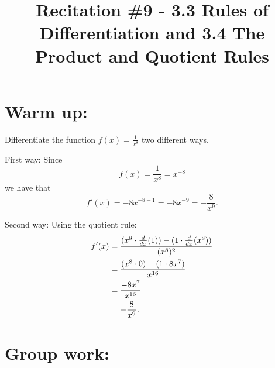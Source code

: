 \documentclass[handout,nooutcomes]{ximera}
\title{Recitation \#9 - 3.3 Rules of Differentiation and 3.4 The Product and Quotient Rules}
\begin{document}
\begin{abstract}		\end{abstract}
\maketitle

\section*{Warm up:} 
Differentiate the function $f(x) = \frac{1}{x^8}$ two different ways.

	\begin{freeResponse}
	First way:  Since 
	$$f(x) = \frac{1}{x^8} = x^{-8}$$
	we have that
	$$f'(x) = -8x^{-8-1} = -8x^{-9} = -\frac{8}{x^9}.$$
	
	Second way:  Using the quotient rule: 
	\begin{align*}
	f'(x) &= \frac{(x^8 \cdot \frac{d}{dx}(1)) - (1 \cdot \frac{d}{dx}(x^8))}{(x^8)^2}  \\
	&= \frac{(x^8 \cdot 0) - (1 \cdot 8x^7)}{x^{16}}  \\
	&= \frac{-8x^7}{x^{16}}  \\
	&= - \frac{8}{x^9}.
	\end{align*}
	\end{freeResponse}	
	
	
	
	
	

\section*{Group work:}
\end{document}
